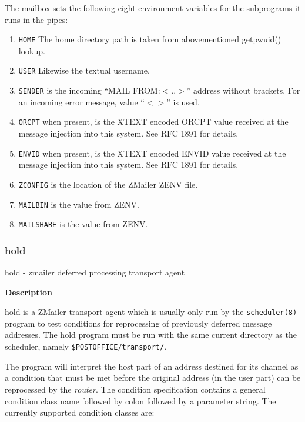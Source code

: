 The mailbox sets the following eight environment variables for the subprograms it runs 
in the pipes:
\begin{enumerate}
\item {\tt HOME} The home directory path is taken from abovementioned getpwuid()
lookup.
\item {\tt USER} Likewise the textual username.
\item {\tt SENDER} is the incoming ``MAIL FROM:{\(<\)}..{\(>\)}'' address without brackets. For
an incoming error message, value ``{\(<\)}{\(>\)}'' is used.
\item {\tt ORCPT} when present, is the XTEXT encoded ORCPT value received at the
message injection into this system. See RFC 1891 for details.
\item {\tt ENVID} when present, is the XTEXT encoded ENVID value received at the
message injection into this system. See RFC 1891 for details.
\item {\tt ZCONFIG} is the location of the ZMailer ZENV file.
\item {\tt MAILBIN} is the value from ZENV.
\item {\tt MAILSHARE} is the value from ZENV.
\end{enumerate}









\subsubsection{hold}



hold - zmailer deferred processing transport agent

{\bf Description}

hold is a ZMailer transport agent which is usually only
run by the {\tt scheduler(8)} program to test conditions for
reprocessing of previously deferred message addresses.
The hold program must be run with the same current directory 
as the scheduler, namely {\tt \$POSTOFFICE/transport/}.

The program will interpret the host part of an address
destined for its channel as a condition that must be met
before the original address (in the user part) can be
reprocessed by the {\em router\/}. The condition specification
contains a general condition class name followed by colon
followed by a parameter string. The currently supported
condition classes are:

